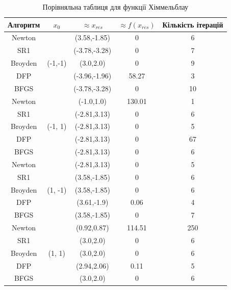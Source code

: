 \begin{table}[h!]
    \centering
    \begin{tabular}{|c|c|c|c|c|}
        \hline
        \textbf{Алгоритм} & $x_{0}$ & $\approx x_{res}$ & $\approx f(x_{res})$ & \textbf{Кількість ітерацій}  \\
        \hline
        Newton & \multirow{5}{*}{(-1,-1)} & (3.58,-1.85) & 0 & 6 \\
        \cline{1-1} \cline{3-5}
        SR1 & & (-3.78,-3.28) & 0 & 7 \\
        \cline{1-1} \cline{3-5}
        Broyden & & (3.0,2.0) & 0 & 9 \\
        \cline{1-1} \cline{3-5}
        DFP & & (-3.96,-1.96) & 58.27 & 3 \\
        \cline{1-1} \cline{3-5}
        BFGS & & (-3.78,-3.28) & 0 & 10 \\
        \cline{1-1} \cline{3-5}
        \hline
        Newton & \multirow{5}{*}{(-1, 1)} & (-1.0,1.0) & 130.01 & 1 \\
        \cline{1-1} \cline{3-5}
        SR1 & & (-2.81,3.13) & 0 & 6 \\
        \cline{1-1} \cline{3-5}
        Broyden & & (-2.81,3.13) & 0 & 5 \\
        \cline{1-1} \cline{3-5}
        DFP & & (-2.81,3.13) & 0 & 67 \\
        \cline{1-1} \cline{3-5}
        BFGS & & (-2.81,3.13) & 0 & 6 \\
        \hline
        Newton & \multirow{5}{*}{(1, -1)} & (-2.81,3.13) & 0 & 5 \\
        \cline{1-1} \cline{3-5}
        SR1 & & (3.58,-1.85) & 0 & 6 \\
        \cline{1-1} \cline{3-5}
        Broyden & & (3.58,-1.85) & 0 & 6 \\
        \cline{1-1} \cline{3-5}
        DFP & & (3.61,-1.9) & 0.06 & 4 \\
        \cline{1-1} \cline{3-5}
        BFGS & & (3.58,-1.85) & 0 & 7 \\
        \hline
        Newton & \multirow{5}{*}{(1, 1)} & (0.92,0.87) & 114.51 & 250 \\
        \cline{1-1} \cline{3-5}
        SR1 & & (3.0,2.0) & 0 & 6 \\
        \cline{1-1} \cline{3-5}
        Broyden & & (3.0,2.0) & 0 & 6 \\
        \cline{1-1} \cline{3-5}
        DFP & & (2.94,2.06) & 0.11 & 5 \\
        \cline{1-1} \cline{3-5}
        BFGS & & (3.0,2.0) & 0 & 6 \\
        \hline
    \end{tabular}
    \caption{Порівняльна таблиця для функції Хіммельблау}
\end{table}

